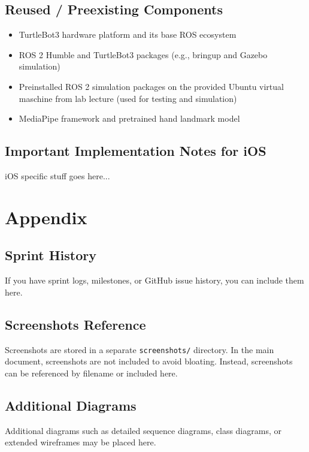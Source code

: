 \documentclass[11pt,a4paper]{article}
\begin{document}
\subsection{Reused / Preexisting Components}
\begin{itemize}[leftmargin=1.5cm]
	\item TurtleBot3 hardware platform and its base ROS ecosystem
	\item ROS 2 Humble and TurtleBot3 packages (e.g., bringup and Gazebo simulation)
	\item Preinstalled ROS 2 simulation packages on the provided Ubuntu virtual maschine from lab lecture (used for testing and simulation)
	\item MediaPipe framework and pretrained hand landmark model
\end{itemize}


\subsection{Important Implementation Notes for iOS}
iOS specific stuff goes here...

\newpage
\appendix
\section{Appendix}

\subsection{Sprint History}
If you have sprint logs, milestones, or GitHub issue history, you can include them here.

\subsection{Screenshots Reference}
Screenshots are stored in a separate \texttt{screenshots/} directory.
In the main document, screenshots are not included to avoid bloating.
Instead, screenshots can be referenced by filename or included here.

\subsection{Additional Diagrams}
Additional diagrams such as detailed sequence diagrams, class diagrams, or extended wireframes may be placed here.
\end{document}
